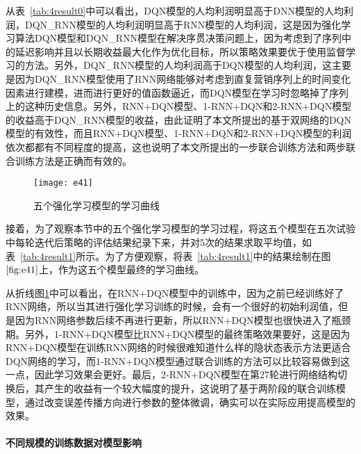  从表~\ref{tab:4result0}中可以看出，DQN模型的人均利润明显高于DNN模型的人均利润，DQN_RNN模型的人均利润明显高于RNN模型的人均利润，这是因为强化学习算法DQN模型和DQN_RNN模型在解决序贯决策问题上，因为考虑到了序列中的延迟影响并且以长期收益最大化作为优化目标，所以策略效果要优于使用监督学习的方法。另外，DQN_RNN模型的人均利润高于DQN模型的人均利润，这主要是因为DQN_RNN模型使用了RNN网络能够对考虑到直复营销序列上的时间变化因素进行建模，进而进行更好的值函数逼近，而DQN模型在学习时忽略掉了序列上的这种历史信息。另外，RNN+DQN模型、1-RNN+DQN和2-RNN+DQN模型的收益高于DQN_RNN模型的收益，由此证明了本文所提出的基于双网络的DQN模型的有效性，而且RNN+DQN模型、1-RNN+DQN和2-RNN+DQN模型的利润依次都都有不同程度的提高，这也说明了本文所提出的一步联合训练方法和两步联合训练方法是正确而有效的。

 \begin{figure}[htbp]
\centering
\texttt{[image: e41]}
\caption{五个强化学习模型的学习曲线}
\label{fig:e41}
\end{figure}

接着，为了观察本节中的五个强化学习模型的学习过程，将这五个模型在五次试验中每轮迭代后策略的评估结果纪录下来，并对5次的结果求取平均值，如表~\ref{tab:4result1}所示。为了方便观察，将表~\ref{tab:4result1}中的结果绘制在图$\ref{fig:e41}$上，作为这五个模型最终的学习曲线。

从折线图\ref{fig:e41}中可以看出，在RNN+DQN模型中的训练中，因为之前已经训练好了RNN网络，所以当其进行强化学习训练的时候，会有一个很好的初始利润值，但是因为RNN网络参数后续不再进行更新，所以RNN+DQN模型也很快进入了瓶颈期。另外，1-RNN+DQN模型比RNN+DQN模型的最终策略效果要好，这是因为RNN+DQN模型在训练RNN网络的时候很难知道什么样的隐状态表示方法更适合DQN网络的学习，而1-RNN+DQN模型通过联合训练的方法可以比较容易做到这一点，因此学习效果会更好。最后，2-RNN+DQN模型在第27轮进行网络结构切换后，其产生的收益有一个较大幅度的提升，这说明了基于两阶段的联合训练模型，通过改变误差传播方向进行参数的整体微调，确实可以在实际应用提高模型的效果。


\paragraph{不同规模的训练数据对模型影响}

